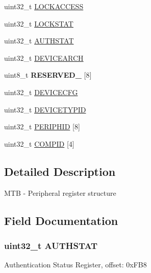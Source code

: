 \begin{DoxyCompactItemize}
\item 
uint32\+\_\+t \hyperlink{struct_m_t_b___mem_map_a85ddf0cc839ca195bad64336b6a86123}{L\+O\+C\+K\+A\+C\+C\+E\+S\+S}
\item 
uint32\+\_\+t \hyperlink{struct_m_t_b___mem_map_abae92c7b40f7130c62cdb81241fdd0e1}{L\+O\+C\+K\+S\+T\+A\+T}
\item 
uint32\+\_\+t \hyperlink{struct_m_t_b___mem_map_a4140c1c606d0e7617563ac4c9fd8c450}{A\+U\+T\+H\+S\+T\+A\+T}
\item 
uint32\+\_\+t \hyperlink{struct_m_t_b___mem_map_a457881b8a73ea9cece24db6cc5a2481b}{D\+E\+V\+I\+C\+E\+A\+R\+C\+H}
\item 
\hypertarget{struct_m_t_b___mem_map_a86684537b595133db57a7bcc73843d2a}{}uint8\+\_\+t {\bfseries R\+E\+S\+E\+R\+V\+E\+D\+\_} \mbox{[}8\mbox{]}\label{struct_m_t_b___mem_map_a86684537b595133db57a7bcc73843d2a}

\item 
uint32\+\_\+t \hyperlink{struct_m_t_b___mem_map_ad35a23bd184366d37228829c33d5bda6}{D\+E\+V\+I\+C\+E\+C\+F\+G}
\item 
uint32\+\_\+t \hyperlink{struct_m_t_b___mem_map_aa736d6fbfbc7e051f6a2caadd4f17b8f}{D\+E\+V\+I\+C\+E\+T\+Y\+P\+I\+D}
\item 
uint32\+\_\+t \hyperlink{struct_m_t_b___mem_map_ab6fdc70dd1345592145d79d210ee616d}{P\+E\+R\+I\+P\+H\+I\+D} \mbox{[}8\mbox{]}
\item 
uint32\+\_\+t \hyperlink{struct_m_t_b___mem_map_a51d2026476b6e1547beb909d07d4aa32}{C\+O\+M\+P\+I\+D} \mbox{[}4\mbox{]}
\end{DoxyCompactItemize}


\subsection{Detailed Description}
M\+T\+B -\/ Peripheral register structure 

\subsection{Field Documentation}
\hypertarget{struct_m_t_b___mem_map_a4140c1c606d0e7617563ac4c9fd8c450}{}
\subsubsection[{A\+U\+T\+H\+S\+T\+A\+T}]{\setlength{\rightskip}{0pt plus 5cm}uint32\+\_\+t A\+U\+T\+H\+S\+T\+A\+T}\label{struct_m_t_b___mem_map_a4140c1c606d0e7617563ac4c9fd8c450}
Authentication Status Register, offset\+: 0x\+F\+B8 \hypertarget{struct_m_t_b___mem_map_aaa2f8b529d9bf3e3bb5bab8c8b073ead}{}
